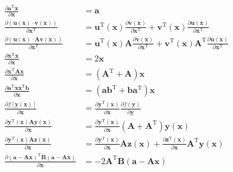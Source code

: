 \documentclass[UTF8,space=auto]{ctexart} %
\begin{document}
\begin{align}
\frac{\partial \mathbf{a}^{\mathrm{T}} \mathbf{x}}{\partial \mathbf{x}} &= \mathbf{a} \\
\frac{\partial(\mathbf{u}(\mathbf{x}) \cdot \mathbf{v}(\mathbf{x}))}{\partial \mathbf{x}^{\mathrm{T}}} &= \mathbf{u}^{\mathrm{T}}(\mathbf{x}) \frac{\partial \mathbf{v}(\mathbf{x})}{\partial \mathbf{x}^{\mathrm{T}}}+\mathbf{v}^{\mathrm{T}}(\mathbf{x})\frac{\partial \mathbf{u}(\mathbf{x})}{\partial \mathbf{x}^{\mathrm{T}}} \\
\frac{\partial(\mathbf{u}(\mathbf{x}) \cdot \mathbf{A} \mathbf{v}(\mathbf{x}))}{\partial \mathbf{x}^{\mathrm{T}}} &= \mathbf{u}^{\mathrm{T}}(\mathbf{x}) \mathbf{A} \frac{\partial \mathbf{v}(\mathbf{x})}{\partial \mathbf{x}^{\mathrm{T}}}+\mathbf{v}^{\mathrm{T}}(\mathbf{x}) \mathbf{A}^{\mathrm{T}} \frac{\partial \mathbf{u}(\mathbf{x})}{\partial \mathbf{x}^{\mathrm{T}}} \\
\frac{\partial \mathbf{x}^{\mathrm{T}} \mathbf{x}}{\partial \mathbf{x}} &= 2 \mathbf{x} \\
\frac{\partial \mathbf{x}^{\mathrm{T}} \mathbf{A} \mathbf{x}}{\partial \mathbf{x}} &= \left(\mathbf{A}^{\mathrm{T}}+\mathbf{A}\right) \mathbf{x} \\
\frac{\partial \mathbf{a}^{\mathrm{T}} \mathbf{x} \mathbf{x}^{\mathrm{T}} \mathbf{b}}{\partial \mathbf{x}} &= \left(\mathbf{a} \mathbf{b}^{\mathrm{T}}+\mathbf{b} \mathbf{a}^{\mathrm{T}}\right) \mathbf{x} \\
\frac{\partial f\left[\mathbf{y}(\mathbf{x})\right]}{\partial \mathbf{x}} &= \frac{\partial \mathbf{y}^{\mathrm{T}}(\mathbf{x}) }{\partial \mathbf{x}} \frac{\partial f(\mathbf{y})}{\partial \mathbf{y}} \\
\frac{\partial\mathbf{y}^{\mathrm{T}}(\mathbf{x}) \mathbf{A} \mathbf{y}(\mathbf{x})}{\partial \mathbf{x}}&=\frac{\partial\mathbf{y}^{\mathrm{T}}(\mathbf{x})}{\partial \mathbf{x}}\left(\mathbf{A}+\mathbf{A}^{\mathrm{T}}\right) \mathbf{y}(\mathbf{x}) \\
\frac{\partial\mathbf{y}^{\mathrm{T}}(\mathbf{x}) \mathbf{A} \mathbf{z}(\mathbf{x})}{\partial \mathbf{x}}&=\frac{\partial \mathbf{y}^{\mathrm{T}}(\mathbf{x}) }{\partial \mathbf{x}} \mathbf{A} \mathbf{z}(\mathbf{x})+\frac{\partial \mathbf{z}^{\mathrm{T}}(\mathbf{x}) }{\partial \mathbf{x}} \mathbf{A}^{\mathrm{T}} \mathbf{y}(\mathbf{x}) \\
\frac{\partial(\mathbf{a}-\mathbf{A} \mathbf{x})^{\mathrm{T}} \mathbf{B}(\mathbf{a}-\mathbf{A} \mathbf{x})}{\partial \mathbf{x}}&=-2 \mathbf{A}^{\mathrm{T}} \mathbf{B}(\mathbf{a}-\mathbf{A} \mathbf{x}) \\

\end{align}
\end{document}
